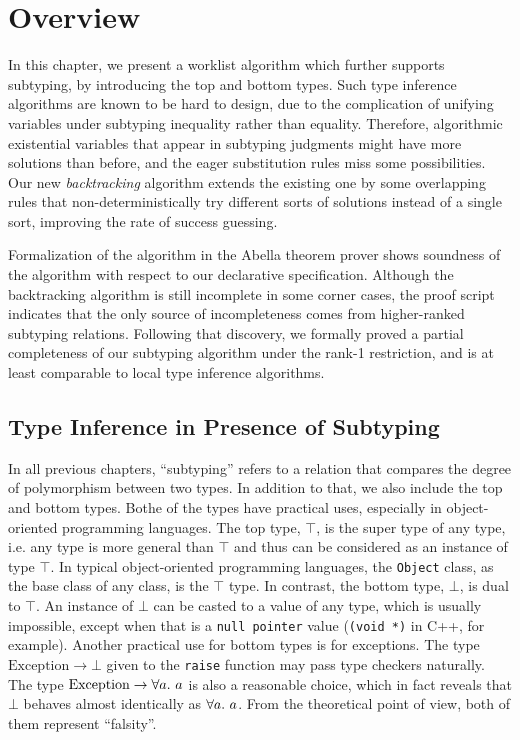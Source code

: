 
\section{Overview}

In this chapter, we present a worklist algorithm
which further supports subtyping,
by introducing the top and bottom types.
Such type inference algorithms are known to be hard to design,
due to the complication of unifying variables under subtyping inequality
rather than equality.
Therefore, algorithmic existential variables that appear in subtyping judgments
might have more solutions than before,
and the eager substitution rules miss some possibilities.
Our new \emph{backtracking} algorithm extends the existing one by some overlapping rules that
non-deterministically try different sorts of solutions instead of a single sort,
improving the rate of success guessing.

Formalization of the algorithm in the Abella theorem prover shows soundness of the algorithm
with respect to our declarative specification.
Although the backtracking algorithm is still incomplete in some corner cases,
the proof script indicates that the only source of incompleteness comes from
higher-ranked subtyping relations.
Following that discovery, we formally proved a partial completeness of our subtyping algorithm
under the rank-1 restriction,
and is at least comparable to local type inference algorithms.

\subsection{Type Inference in Presence of Subtyping}

In all previous chapters, ``subtyping'' refers to a relation that compares
the degree of polymorphism between two types.
In addition to that, we also include the top and bottom types.
Bothe of the types have practical uses, especially in object-oriented programming languages.
The top type, $\top$, is the super type of any type,
i.e. any type is more general than $\top$
and thus can be considered as an instance of type $\top$.
In typical object-oriented programming languages, the \texttt{Object} class,
as the base class of any class, is the $\top$ type.
In contrast, the bottom type, $\bot$, is dual to $\top$.
An instance of $\bot$ can be casted to a value of any type, which is usually impossible,
except when that is a \texttt{null pointer} value (\texttt{(void *)} in C++, for example).
Another practical use for bottom types is for exceptions.
The type $\text{Exception} \to \bot$ given to the \texttt{raise}
function may pass type checkers naturally.
The type $\text{Exception} \to \all a$ is also a reasonable choice,
which in fact reveals that $\bot$ behaves almost identically as $\all a$.
From the theoretical point of view, both of them represent ``falsity''.

